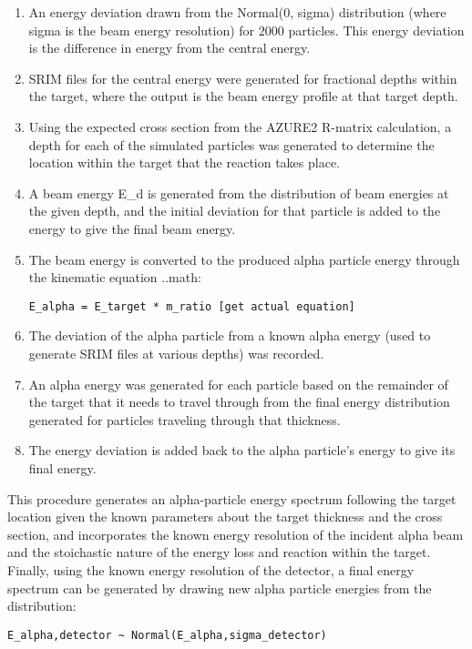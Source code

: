 \begin{enumerate}
\item
  An energy deviation drawn from the Normal(0, sigma) distribution
  (where sigma is the beam energy resolution) for 2000 particles. This
  energy deviation is the difference in energy from the central energy.
\item
  SRIM files for the central energy were generated for fractional depths
  within the target, where the output is the beam energy profile at that
  target depth.
\item
  Using the expected cross section from the AZURE2 R-matrix calculation,
  a depth for each of the simulated particles was generated to determine
  the location within the target that the reaction takes place.
\item
  A beam energy E\_d is generated from the distribution of beam energies
  at the given depth, and the initial deviation for that particle is
  added to the energy to give the final beam energy.
\item
  The beam energy is converted to the produced alpha particle energy
  through the kinematic equation ..math:

\begin{verbatim}
E_alpha = E_target * m_ratio [get actual equation]
\end{verbatim}
\item
  The deviation of the alpha particle from a known alpha energy (used to
  generate SRIM files at various depths) was recorded.
\item
  An alpha energy was generated for each particle based on the remainder
  of the target that it needs to travel through from the final energy
  distribution generated for particles traveling through that thickness.
\item
  The energy deviation is added back to the alpha particle's energy to
  give its final energy.
\end{enumerate}

This procedure generates an alpha-particle energy spectrum following the
target location given the known parameters about the target thickness
and the cross section, and incorporates the known energy resolution of
the incident alpha beam and the stoichastic nature of the energy loss
and reaction within the target. Finally, using the known energy
resolution of the detector, a final energy spectrum can be generated by
drawing new alpha particle energies from the distribution:

\begin{verbatim}
E_alpha,detector ~ Normal(E_alpha,sigma_detector)
\end{verbatim}

